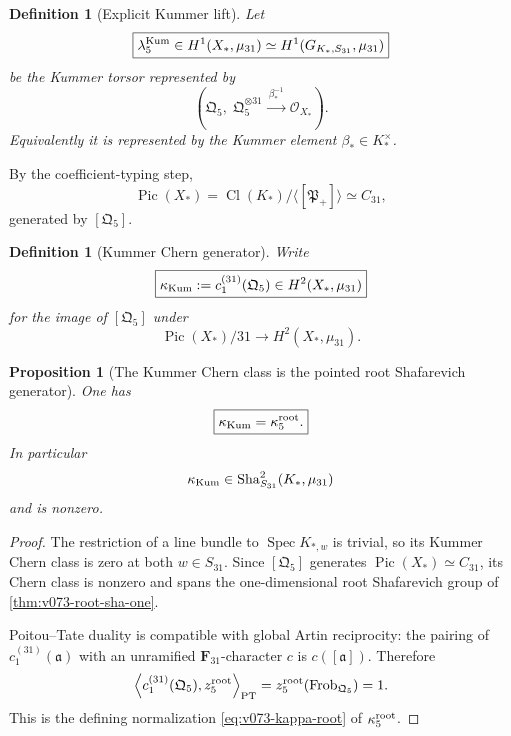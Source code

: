 \documentclass[11pt]{article}
\newtheorem{proposition}[theorem]{Proposition}
\newtheorem{definition}[theorem]{Definition}
\theoremstyle{remark}
\providecommand{\Sha}{\operatorname{Sha}}
\begin{document}
\begin{definition}[Explicit Kummer lift]
\label{def:v074-kummer-lift}
Let
\begin{equation}
 \boxed{
 \lambda_5^{\rm Kum}
 \in H^1(X_*,\mu_{31})
 \simeq H^1(G_{K_*,S_{31}},\mu_{31})}
 \label{eq:v074-kummer-lift}
\end{equation}
be the Kummer torsor represented by
\[
 \left(
 \mathfrak Q_5,\;
 \mathfrak Q_5^{\otimes31}
 \xrightarrow{\ \beta_*^{-1}\ }
 \mathcal O_{X_*}
 \right).
\]
Equivalently it is represented by the Kummer element \(\beta_*\in K_*^\times\).
\end{definition}

By the coefficient-typing step,
\[
 \operatorname{Pic}(X_*)
 =
 \operatorname{Cl}(K_*)/
 \langle[\mathfrak P_+]\rangle
 \simeq C_{31},
\]
generated by \([\mathfrak Q_5]\).

\begin{definition}[Kummer Chern generator]
\label{def:v074-kummer-chern}
Write
\begin{equation}
 \boxed{
 \kappa_{\rm Kum}
 :=
 c_1^{(31)}(\mathfrak Q_5)
 \in H^2(X_*,\mu_{31})}
 \label{eq:v074-kummer-chern}
\end{equation}
for the image of \([\mathfrak Q_5]\) under
\[
 \operatorname{Pic}(X_*)/31
 \longrightarrow H^2(X_*,\mu_{31}).
\]
\end{definition}

\begin{proposition}[The Kummer Chern class is the pointed root
Shafarevich generator]
\label{prop:v074-kummer-equals-kappa}
One has
\begin{equation}
 \boxed{
 \kappa_{\rm Kum}
 =
 \kappa_5^{\rm root}.}
 \label{eq:v074-kummer-equals-kappa}
\end{equation}
In particular
\[
 \kappa_{\rm Kum}
 \in
 \Sha^2_{S_{31}}(K_*,\mu_{31})
\]
and is nonzero.
\end{proposition}

\begin{proof}
The restriction of a line bundle to \(\operatorname{Spec}K_{*,w}\) is
trivial, so its Kummer Chern class is zero at both \(w\in S_{31}\).
Since \([\mathfrak Q_5]\) generates
\(\operatorname{Pic}(X_*)\simeq C_{31}\), its Chern class is nonzero and
spans the one-dimensional root Shafarevich group of
\cref{thm:v073-root-sha-one}.

Poitou--Tate duality is compatible with global Artin reciprocity: the
pairing of \(c_1^{(31)}(\mathfrak a)\) with an unramified
\(\mathbf F_{31}\)-character \(c\) is \(c([\mathfrak a])\).  Therefore
\[
 \left\langle
 c_1^{(31)}(\mathfrak Q_5),
 z_5^{\rm root}
 \right\rangle_{\rm PT}
 =
 z_5^{\rm root}(\operatorname{Frob}_{\mathfrak Q_5})
 =1.
\]
This is the defining normalization
\eqref{eq:v073-kappa-root} of \(\kappa_5^{\rm root}\).
\end{proof}
\end{document}
